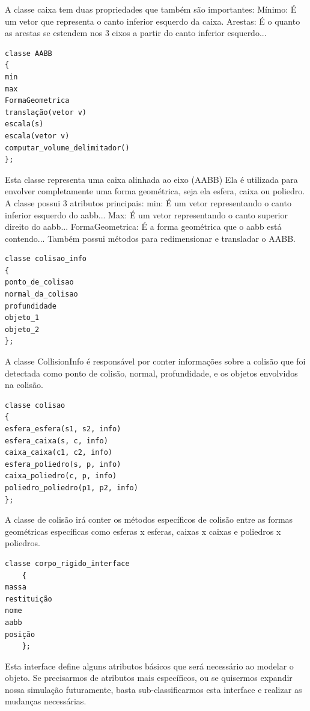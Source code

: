 A classe caixa tem duas propriedades que também são importantes:
Mínimo: É um vetor que representa o canto inferior esquerdo da caixa.
Arestas: É o quanto as arestas se estendem nos 3 eixos a partir do canto
inferior esquerdo...

\begin{lstlisting}[frame=single,caption=Código de exemplo\label{codigo1}]
classe AABB
{
min
max
FormaGeometrica
translação(vetor v)
escala(s)
escala(vetor v)
computar_volume_delimitador()
};
\end{lstlisting}

Esta classe representa uma caixa alinhada ao eixo (AABB) Ela é utilizada para
envolver completamente uma forma geométrica, seja ela esfera, caixa ou
poliedro.
A classe possui 3 atributos principais:
min: É um vetor representando o canto inferior esquerdo do aabb...
Max: É um vetor representando o canto superior direito do aabb...
FormaGeometrica: É a forma geométrica que o aabb está contendo...
Também possui métodos para redimensionar e transladar o AABB.

\begin{lstlisting}[frame=single,caption=Código de exemplo\label{codigo1}]
classe colisao_info
{
ponto_de_colisao
normal_da_colisao
profundidade
objeto_1
objeto_2
};
\end{lstlisting}

A classe CollisionInfo é responsável por conter informações sobre a colisão que
foi detectada como ponto de colisão, normal, profundidade, e os objetos
envolvidos na colisão.

\begin{lstlisting}[frame=single,caption=Código de exemplo\label{codigo1}]
classe colisao
{
esfera_esfera(s1, s2, info)
esfera_caixa(s, c, info)
caixa_caixa(c1, c2, info)
esfera_poliedro(s, p, info)
caixa_poliedro(c, p, info)
poliedro_poliedro(p1, p2, info)
};
\end{lstlisting}

A classe de colisão irá conter os métodos específicos de colisão entre as
formas geométricas específicas como esferas x esferas, caixas x caixas e
poliedros x poliedros.

\begin{lstlisting}[frame=single,caption=Código de exemplo\label{codigo1}]
classe corpo_rigido_interface
    {
massa
restituição
nome
aabb
posição
    };
\end{lstlisting}

Esta interface define alguns atributos básicos que será necessário ao modelar o
objeto. Se precisarmos de atributos mais específicos, ou se quisermos expandir
nossa simulação futuramente, basta sub-classificarmos esta interface e realizar
as mudanças necessárias.

